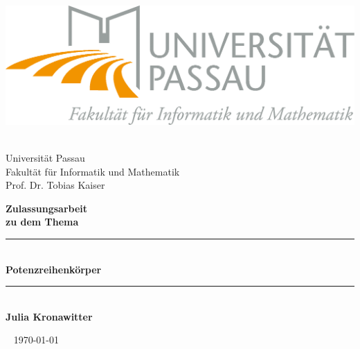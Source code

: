 
\thispagestyle{empty}
%
\begin{center}
\includegraphics[scale=2]{logo.png}
\end{center}
%
\begin{center}
\Large
~\\[0.2cm]
Universität Passau \\
Fakultät für Informatik und Mathematik \\
Prof. Dr. Tobias Kaiser \\
\vspace{50pt}
\end{center}
%
{\huge \centering
\textbf{Zulassungsarbeit}
\vspace{10pt}\\}
{\centering \textbf{zu dem Thema}
\vspace{10pt}\\}

%

{\Large\centering
\rule{\textwidth}{3pt}
~\\[0.01cm]
{\fontsize{30pt}{25pt}\selectfont\bfseries Potenzreihenkörper}
~\\[0.01cm]
\rule{\textwidth}{3pt}
~\\[0.4cm]
\vfill
{\centering
\Large \bfseries Julia Kronawitter \\}
\vfill
}
\vspace{30pt}
%
%
%
{\centering

~\vfill
\today\\}
